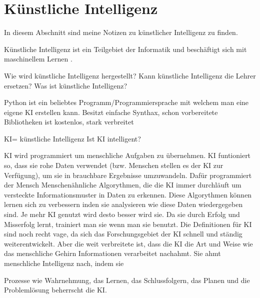 \section{Künstliche Intelligenz}
\label{sec:ai}

In diesem Abschnitt sind meine Notizen zu künstlicher Intelligenz zu finden.

Künstliche Intelligenz ist ein Teilgebiet der Informatik und beschäftigt sich mit maschinellem Lernen \citep{ai-wikipedia}.




Wie wird künstliche Intelligenz hergestellt?
Kann künstliche Intelligenz die Lehrer ersetzen?
Was ist künstliche Intelligenz?



Python ist ein beliebtes Programm/Programmiersprache mit welchem man eine eigene KI erstellen kann.
Besitzt einfache Synthax, schon vorbereitete Bibliotheken
ist kostenlos, stark verbreitet

KI= künstliche Intelligenz 
Ist KI intelligent?

KI wird programmiert um menschliche Aufgaben zu übernehmen.
KI funtioniert so, dass sie rohe Daten verwendet (bzw. Menschen stellen es der KI zur Verfügung), um sie in brauchbare Ergebnisse umzuwandeln.
Dafür programmiert der Mensch Menschenähnliche Algorythmen, die die KI immer durchläuft um versteckte Informationsmuster in Daten zu erkennen.
Diese Algorythmen können lernen sich zu verbessern inden sie analysieren wie diese Daten wiedergegeben sind.
Je mehr KI genutzt wird desto besser wird sie. Da sie durch Erfolg und Misserfolg lernt, trainiert man sie wenn man sie benutzt.
Die Definitionen für KI sind noch recht vage, da sich das Forschungsgebiet der KI schnell und ständig weiterentwickelt. Aber die weit verbreitete ist,
dass die KI die Art und Weise wie das menschliche Gehirn Informationen verarbeitet nachahmt.
Sie ahmt menschliche Intelligenz nach, indem sie 

Prozesse wie Wahrnehmung, das Lernen, das Schlussfolgern, das Planen und die Problemlösung beherrscht die KI.
